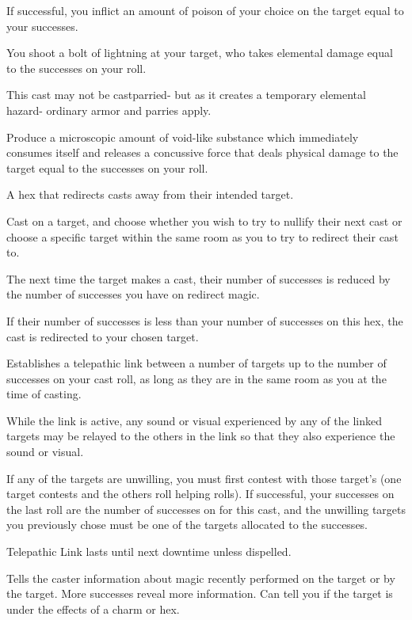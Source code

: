 \begin{GRPtablewide}
{		If successful, you inflict an amount of poison of your choice on the target equal to your successes.
	}

	{%
	You shoot a bolt of lightning at your target, who takes elemental damage equal to the successes on your roll.

	This cast may not be castparried- but as it creates a temporary elemental hazard- ordinary armor and parries apply.
	}

	{%
	Produce a microscopic amount of void-like substance which immediately consumes itself and releases a concussive force that deals physical damage to the target equal to the successes on your roll.
	}

	{%
	A hex that redirects casts away from their intended target.

	Cast on a target, and choose whether you wish to try to nullify their next cast or choose a specific target within the same room as you to try to redirect their cast to.

	The next time the target makes a cast, their number of successes is reduced by the number of successes you have on redirect magic. 

	If their number of successes is less than your number of successes on this hex, the cast is redirected to your chosen target.
	}

	{%
	Establishes a telepathic link between a number of targets up to the number of successes on your cast roll, as long as they are in the same room as you at the time of casting.

	While the link is active, any sound or visual experienced by any of the linked targets may be relayed to the others in the link so that they also experience the sound or visual.

	If any of the targets are unwilling, you must first contest with those target's  (one target contests and the others roll helping rolls). If successful, your successes on the last roll are the number of successes on for this cast, and the unwilling targets you previously chose must be one of the targets allocated to the successes.

	Telepathic Link lasts until next downtime unless dispelled.
	}

	{%
	Tells the caster information about magic recently performed on the target or by the target. More successes reveal more information. Can tell you if the target is under the effects of a charm or hex.

}
\end{GRPtablewide}
